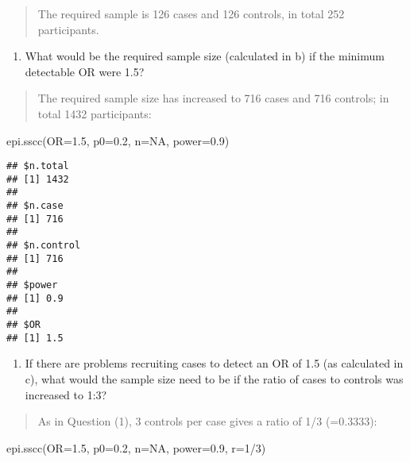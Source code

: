 \documentclass[
]{memoir}
\newenvironment{Shaded}{\begin{snugshade}}{\end{snugshade}}
\newcommand{\AttributeTok}[1]{\textcolor[rgb]{0.77,0.63,0.00}{#1}}
\newcommand{\ConstantTok}[1]{\textcolor[rgb]{0.00,0.00,0.00}{#1}}
\newcommand{\DecValTok}[1]{\textcolor[rgb]{0.00,0.00,0.81}{#1}}
\newcommand{\FloatTok}[1]{\textcolor[rgb]{0.00,0.00,0.81}{#1}}
\newcommand{\FunctionTok}[1]{\textcolor[rgb]{0.00,0.00,0.00}{#1}}
\newcommand{\NormalTok}[1]{#1}
\newcommand{\SpecialCharTok}[1]{\textcolor[rgb]{0.00,0.00,0.00}{#1}}
\providecommand{\tightlist}{%
  \setlength{\itemsep}{0pt}\setlength{\parskip}{0pt}}
\begin{document}
\begin{quote}
The required sample is 126 cases and 126 controls, in total 252 participants.
\end{quote}

\begin{enumerate}
\def\labelenumi{\alph{enumi})}
\setcounter{enumi}{2}
\tightlist
\item
  What would be the required sample size (calculated in b) if the minimum detectable OR were 1.5?
\end{enumerate}

\begin{quote}
The required sample size has increased to 716 cases and 716 controls; in total 1432 participants:
\end{quote}

\begin{Shaded}
\begin{Highlighting}[]
\FunctionTok{epi.sscc}\NormalTok{(}\AttributeTok{OR=}\FloatTok{1.5}\NormalTok{, }\AttributeTok{p0=}\FloatTok{0.2}\NormalTok{, }\AttributeTok{n=}\ConstantTok{NA}\NormalTok{, }\AttributeTok{power=}\FloatTok{0.9}\NormalTok{)}
\end{Highlighting}
\end{Shaded}

\begin{verbatim}
## $n.total
## [1] 1432
## 
## $n.case
## [1] 716
## 
## $n.control
## [1] 716
## 
## $power
## [1] 0.9
## 
## $OR
## [1] 1.5
\end{verbatim}

\begin{enumerate}
\def\labelenumi{\alph{enumi})}
\setcounter{enumi}{3}
\tightlist
\item
  If there are problems recruiting cases to detect an OR of 1.5 (as calculated in c), what would the sample size need to be if the ratio of cases to controls was increased to 1:3?
\end{enumerate}

\begin{quote}
As in Question (1), 3 controls per case gives a ratio of 1/3 (=0.3333):
\end{quote}

\begin{Shaded}
\begin{Highlighting}[]
\FunctionTok{epi.sscc}\NormalTok{(}\AttributeTok{OR=}\FloatTok{1.5}\NormalTok{, }\AttributeTok{p0=}\FloatTok{0.2}\NormalTok{, }\AttributeTok{n=}\ConstantTok{NA}\NormalTok{, }\AttributeTok{power=}\FloatTok{0.9}\NormalTok{, }\AttributeTok{r=}\DecValTok{1}\SpecialCharTok{/}\DecValTok{3}\NormalTok{)}
\end{Highlighting}
\end{Shaded}
\end{document}
